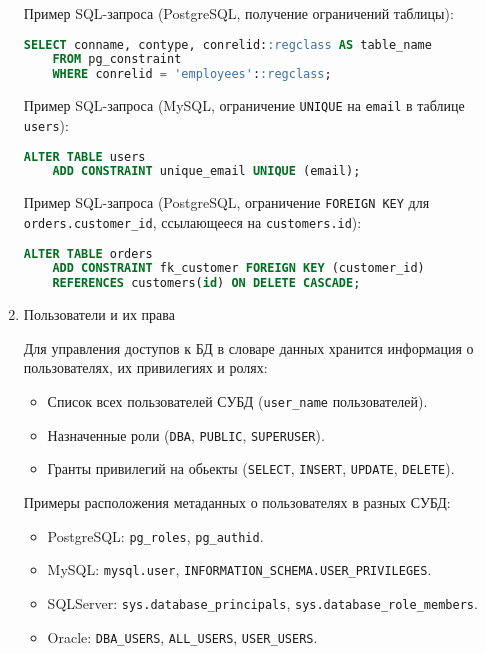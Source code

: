 \begin{enumerate}
    Пример SQL-запроса (PostgreSQL, получение ограничений таблицы):
    \begin{lstlisting}[language=SQL]
    SELECT conname, contype, conrelid::regclass AS table_name 
    FROM pg_constraint 
    WHERE conrelid = 'employees'::regclass; 
    \end{lstlisting}

    Пример SQL-запроса (MySQL, ограничение \texttt{UNIQUE} на \texttt{email} в таблице \texttt{users}):
    \begin{lstlisting}[language=SQL]
    ALTER TABLE users
    ADD CONSTRAINT unique_email UNIQUE (email);    
    \end{lstlisting}

    Пример SQL-запроса (PostgreSQL, ограничение \texttt{FOREIGN KEY} для \texttt{orders.customer\_id}, ссылающееся на \texttt{customers.id}):
    \begin{lstlisting}[language=SQL]
    ALTER TABLE orders
    ADD CONSTRAINT fk_customer FOREIGN KEY (customer_id)
    REFERENCES customers(id) ON DELETE CASCADE;
    \end{lstlisting}

    \item Пользователи и их права \autocite{MicrosoftLearnSQLserverPerm, oracledbdoc3}

    Для управления доступов к БД в словаре данных хранится информация о пользователях, их привилегиях и ролях:
    \begin{itemize}
        \item Список всех пользователей СУБД (\texttt{user\_name} пользователей).
        \item Назначенные роли (\texttt{DBA}, \texttt{PUBLIC}, \texttt{SUPERUSER}).
        \item Гранты привилегий на обьекты (\texttt{SELECT}, \texttt{INSERT}, \texttt{UPDATE}, \texttt{DELETE}).
    \end{itemize}

		Примеры расположения метаданных о пользователях в разных СУБД:

    \begin{itemize}
        \item PostgreSQL: \texttt{pg\_roles}, \texttt{pg\_authid}.
        \item MySQL: \texttt{mysql.user}, \texttt{INFORMATION\_SCHEMA.USER\_PRIVILEGES}.
        \item SQLServer: \texttt{sys.database\_principals}, \texttt{sys.database\_role\_members}.
        \item Oracle: \texttt{DBA\_USERS}, \texttt{ALL\_USERS}, \texttt{USER\_USERS}.
    \end{itemize}


\end{enumerate}
